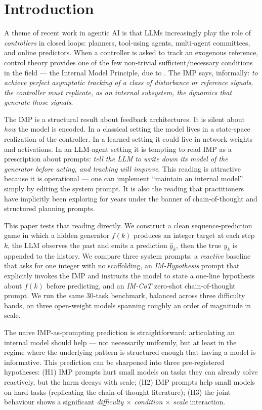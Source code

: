 \documentclass[11pt]{article}
\begin{document}
\section{Introduction}
\label{sec:intro}

A theme of recent work in agentic AI is that LLMs increasingly play
the role of \emph{controllers} in closed loops: planners, tool-using
agents, multi-agent committees, and online predictors.  When a
controller is asked to track an exogenous reference, control theory
provides one of the few non-trivial sufficient/necessary conditions in
the field --- the Internal Model Principle, due to
\citet{francis1976internal}.  The IMP says, informally: \emph{to
achieve perfect asymptotic tracking of a class of disturbance or
reference signals, the controller must replicate, as an internal
subsystem, the dynamics that generate those signals}.

The IMP is a structural result about feedback architectures.  It is
silent about \emph{how} the model is encoded.  In a classical setting
the model lives in a state-space realization of the controller.  In
a learned setting it could live in network weights and activations.
In an LLM-agent setting it is tempting to read IMP as a prescription
about prompts: \emph{tell the LLM to write down its model of the
generator before acting, and tracking will improve}.  This reading is
attractive because it is operational --- one can implement
``maintain an internal model'' simply by editing the system prompt.
It is also the reading that practitioners have implicitly been
exploring for years under the banner of chain-of-thought
\citep{wei2022chain,kojima2022zero} and structured planning prompts.

This paper tests that reading directly.  We construct a clean
sequence-prediction game in which a hidden generator $f(k)$ produces
an integer target at each step $k$, the LLM observes the past and
emits a prediction $\hat y_k$, then the true $y_k$ is appended to the
history.  We compare three system prompts: a \emph{reactive} baseline
that asks for one integer with no scaffolding, an \emph{IM-Hypothesis}
prompt that explicitly invokes the IMP and instructs the model to
state a one-line hypothesis about $f(k)$ before predicting, and an
\emph{IM-CoT} zero-shot chain-of-thought prompt.  We run the same
$30$-task benchmark, balanced across three difficulty bands, on three
open-weight models spanning roughly an order of magnitude in scale.

The naive IMP-as-prompting prediction is straightforward:
articulating an internal model should help --- not necessarily
uniformly, but at least in the regime where the underlying pattern
is structured enough that having a model is informative.  This
prediction can be sharpened into three pre-registered hypotheses:
(H1) IMP prompts hurt small models on tasks they can already solve
reactively, but the harm decays with scale; (H2) IMP prompts help
small models on hard tasks (replicating the chain-of-thought
literature); (H3) the joint behaviour shows a significant
\emph{difficulty $\times$ condition $\times$ scale} interaction.
\end{document}
